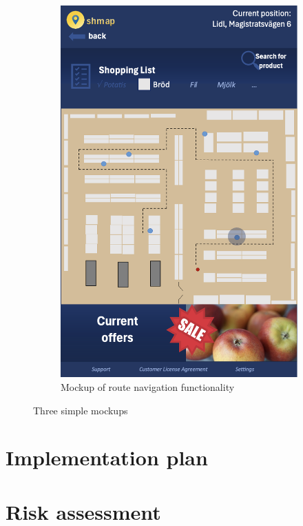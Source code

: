 \documentclass[titlepage]{article}
\begin{document}
\begin{figure}[h!]
\begin{subfigure}[b]{0.3\linewidth}
      \includegraphics[width=\textwidth]{ShopRoute.png}
    \caption{Mockup of route navigation functionality}
      \end{subfigure}
    \caption{Three simple mockups}
    \label{fig:mockups}
\end{figure}

\section{Implementation plan}

\section{Risk assessment}
\end{document}
